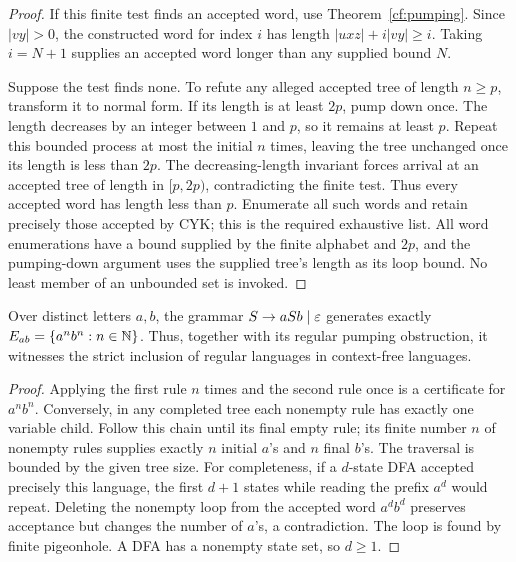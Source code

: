 \begin{proof}
If this finite test finds an accepted word, use
Theorem~\ref{cf:pumping}.  Since $|vy|>0$, the constructed word for index
$i$ has length $|uxz|+i|vy|\geq i$.  Taking $i=N+1$ supplies an accepted
word longer than any supplied bound $N$.

Suppose the test finds none.  To refute any alleged accepted tree of length
$n\geq p$, transform it to normal form.  If its length is at least $2p$,
pump down once.  The length decreases by an integer between $1$ and $p$,
so it remains at least $p$.  Repeat this bounded process at most the
initial $n$ times, leaving the tree unchanged once its length is less
than $2p$.  The decreasing-length invariant forces arrival at an accepted
tree of length in $[p,2p)$, contradicting the finite test.  Thus every
accepted word has length less than $p$.  Enumerate all such words and
retain precisely those accepted by CYK; this is the required exhaustive
list.  All word enumerations have a bound supplied by the finite alphabet
and $2p$, and the pumping-down argument uses the supplied tree's length
as its loop bound.  No least member of an unbounded set is invoked.
\end{proof}

\begin{proposition}
\label{cf:equal-blocks}
Over distinct letters $a,b$, the grammar $S\to aSb\mid\varepsilon$ generates
exactly $E_{ab}=\{a^n b^n:n\in\mathbb N\}$.  Thus, together with its regular
pumping obstruction, it witnesses the strict inclusion of regular
languages in context-free languages.
\end{proposition}

\begin{proof}
Applying the first rule $n$ times and the second rule once is a certificate
for $a^n b^n$.  Conversely, in any completed tree each nonempty rule has
exactly one variable child.  Follow this chain until its final empty rule;
its finite number $n$ of nonempty rules supplies exactly $n$ initial $a$'s
and $n$ final $b$'s.  The traversal is bounded by the given tree size.
For completeness, if a $d$-state DFA accepted precisely this language,
the first $d+1$ states while reading the prefix $a^d$ would repeat.
Deleting the nonempty loop from the accepted word $a^d b^d$ preserves
acceptance but changes the number of $a$'s, a contradiction.  The loop is
found by finite pigeonhole.  A DFA has a nonempty state set, so $d\geq1$.
\end{proof}

